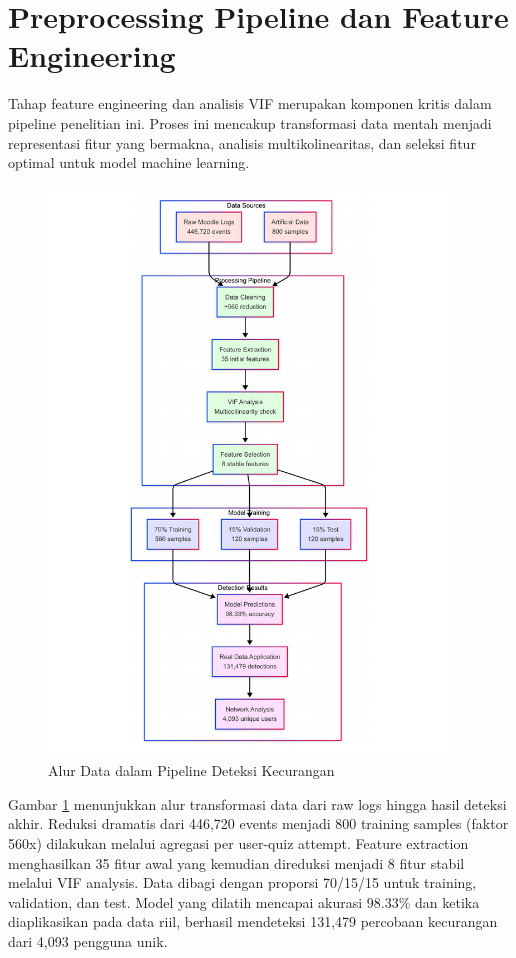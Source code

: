 \section{Preprocessing Pipeline dan Feature Engineering}
\label{sec:preprocessingPipelineFeatureEngineering}
Tahap feature engineering dan analisis VIF merupakan komponen kritis dalam pipeline penelitian ini. Proses ini mencakup transformasi data mentah menjadi representasi fitur yang bermakna, analisis multikolinearitas, dan seleksi fitur optimal untuk model machine learning. 

\begin{figure}[htbp]
    \centering
    \includegraphics[width=0.95\textwidth]{figures/data_flow_diagram.pdf}
    \caption{Alur Data dalam Pipeline Deteksi Kecurangan}
    \label{fig:data_flow}
\end{figure}

Gambar \ref{fig:data_flow} menunjukkan alur transformasi data dari raw logs hingga hasil deteksi akhir. Reduksi dramatis dari 446,720 events menjadi 800 training samples (faktor 560x) dilakukan melalui agregasi per user-quiz attempt. Feature extraction menghasilkan 35 fitur awal yang kemudian direduksi menjadi 8 fitur stabil melalui VIF analysis. Data dibagi dengan proporsi 70/15/15 untuk training, validation, dan test. Model yang dilatih mencapai akurasi 98.33\% dan ketika diaplikasikan pada data riil, berhasil mendeteksi 131,479 percobaan kecurangan dari 4,093 pengguna unik.

